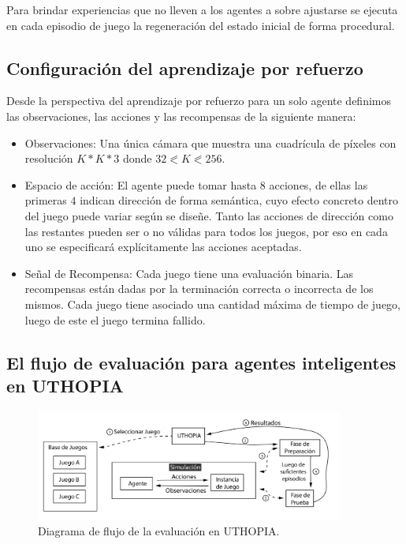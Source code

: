 Para brindar experiencias que no lleven a los agentes a sobre ajustarse se ejecuta en cada episodio de juego la regeneración del estado inicial de forma procedural.

\subsection{Configuración del aprendizaje por refuerzo}

Desde la perspectiva del aprendizaje por refuerzo para un solo agente definimos las observaciones, las acciones y las recompensas de la siguiente manera:

\begin{itemize}
    \item Observaciones: Una única cámara que muestra una cuadrícula de píxeles con resolución $K * K * 3$ donde $32 \eqslantless K \eqslantless 256$.
    \item Espacio de acción: El agente puede tomar hasta $8$ acciones, de ellas las primeras $4$ indican dirección de forma semántica, cuyo efecto concreto dentro del juego puede variar según se diseñe. Tanto las acciones de dirección como las restantes pueden ser o no válidas para todos los juegos, por eso en cada uno se especificará explícitamente las acciones aceptadas.
    \item Señal de Recompensa: Cada juego tiene una evaluación binaria. Las recompensas están dadas por la terminación correcta o incorrecta de los mismos. Cada juego tiene asociado una cantidad máxima de tiempo de juego, luego de este el juego termina fallido.
\end{itemize} 

\subsection{El flujo de evaluación para agentes inteligentes en UTHOPIA}\label{chapter:proposal:evaluation-flow}

\begin{figure}[ht!]
    \centering
    \includegraphics[width=0.9\textwidth]{Graphics/uthopia_flow.png}
    \caption{Diagrama de flujo de la evaluación en UTHOPIA.}
    \label{fig:uthopia_flow}
\end{figure}

